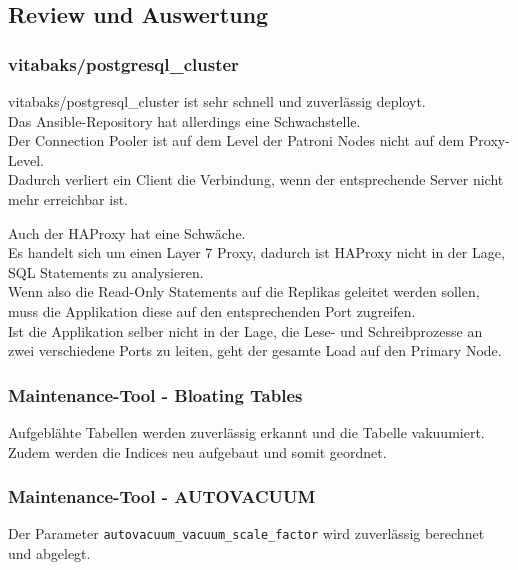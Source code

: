 
\begin{flushleft}
    \subsection{Review und Auswertung}
    \subsubsection{vitabaks/postgresql\_cluster}
    vitabaks/postgresql\_cluster ist sehr schnell und zuverlässig deployt.\\
    Das \Gls{Ansible}-Repository hat allerdings eine Schwachstelle.\\
    Der \Gls{Connection Pooler} ist auf dem Level der Patroni Nodes nicht auf dem Proxy-Level.\\
    Dadurch verliert ein Client die Verbindung, wenn der entsprechende Server nicht mehr erreichbar ist.
\end{flushleft}
\begin{flushleft}
    Auch der \Gls{HAProxy} hat eine Schwäche.\\
    Es handelt sich um einen Layer 7 Proxy, dadurch ist \Gls{HAProxy} nicht in der Lage, SQL Statements zu analysieren.\\
    Wenn also die Read-Only Statements auf die Replikas geleitet werden sollen, muss die Applikation diese auf den entsprechenden Port zugreifen.\\
    Ist die Applikation selber nicht in der Lage, die Lese- und Schreibprozesse an zwei verschiedene Ports zu leiten, geht der gesamte Load auf den Primary Node.
\end{flushleft}
\begin{flushleft}
    \subsubsection{Maintenance-Tool - Bloating Tables}
    Aufgeblähte Tabellen werden zuverlässig erkannt und die Tabelle vakuumiert.\\
    Zudem werden die Indices neu aufgebaut und somit geordnet.
    \subsubsection{Maintenance-Tool - \Gls{AUTOVACUUM}}
    Der Parameter \texttt{autovacuum\_vacuum\_scale\_factor} wird zuverlässig berechnet und abgelegt.
\end{flushleft}